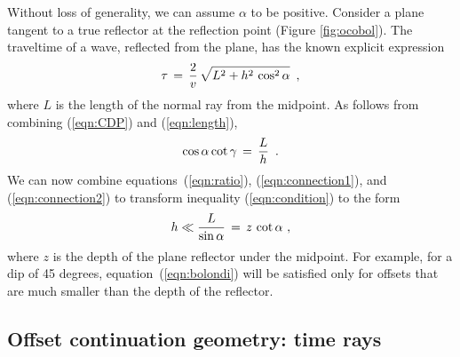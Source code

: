 Without loss of generality, we can assume $\alpha$ to be positive.
Consider a plane tangent to a true reflector at the reflection
point
(Figure \ref{fig:ocobol}).
The traveltime of a wave, reflected from the plane, has the
known explicit expression
\begin{equation}
\tau\,=\,{2 \over v}\,\sqrt{L^2+h^2\,\cos^2{\alpha}}\,\,\,,   
\label{eqn:CDP} 
\end{equation}
where $L$ is the length of the normal ray from the midpoint. As
follows from combining (\ref{eqn:CDP}) and (\ref{eqn:length}),
\begin{equation}
{\cos{\alpha} \cot{\gamma}} \,=\, {L \over h}   \,\,\,.
\label{eqn:ratio} 
\end{equation}
We can now combine equations~(\ref{eqn:ratio}),
(\ref{eqn:connection1}), and (\ref{eqn:connection2}) to transform
inequality (\ref{eqn:condition}) to the form
\begin{equation}
 h \ll {L \over {\sin{\alpha}}} \,=\, z\, \cot{\alpha}\,\,,   
\label{eqn:hm} 
\end{equation}
where $z$ is the depth of the plane reflector under the midpoint.  For
example, for a dip of 45 degrees, equation~(\ref{eqn:bolondi}) will be
satisfied only for offsets that are much smaller than the depth of the
reflector.

  
\subsection{Offset continuation geometry: time rays}

